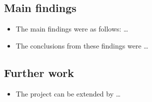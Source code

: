 \documentclass[12pt,a4paper]{article}
\begin{document}
\subsection{Main findings}
\begin{itemize}
    \item The main findings were as follows: \dots
    \item The conclusions from these findings were \dots
\end{itemize}

\subsection{Further work}
\begin{itemize}
    \item The project can be extended by \dots
\end{itemize}

\cite{}

\end{document}
